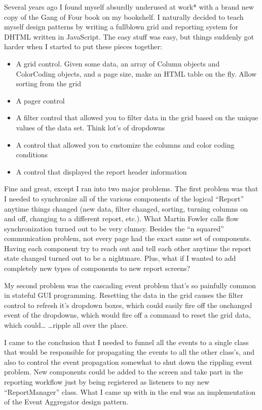 \documentclass{article}
\begin{document}
{Several years ago I found myself absurdly underused at work* with a brand new copy of the Gang of Four book on my bookshelf.  I naturally decided to teach myself design patterns by writing a fullblown grid and reporting system for DHTML written in JavaScript.  The easy stuff was easy, but things suddenly got harder when I started to put these pieces together:

 \begin{itemize}
     \item  A grid control.  Given some data, an array of Column objects and ColorCoding objects, and a page size, make an HTML table on the fly.  Allow sorting from the grid  
 \item  A pager control  
 \item  A filter control that allowed you to filter data in the grid based on the unique values of the data set.  Think lot's of dropdowns  
 \item  A control that allowed you to customize the columns and color coding conditions  
 \item  A control that displayed the report header information  
 \end{itemize}
 
Fine and great, except I  ran into two major problems.  The first problem was that I needed to synchronize all of the various components of the logical “Report” anytime things changed (new data, filter changed, sorting, turning columns on and off, changing to a different report, etc.).  What Martin Fowler calls flow synchronization turned out to be very clumsy.  Besides the “n squared” communication problem, not every page had the exact same set of components.  Having each component try to reach out and tell each other anytime the report state changed turned out to be a nightmare.  Plus, what if I wanted to add completely new types of components to new report screens?

My second problem was the cascading event problem that's so painfully common in stateful GUI programming.  Resetting the data in the grid causes the filter control to refresh it's dropdown boxes, which could easily fire off the onchanged event of the dropdowns, which would fire off a command to reset the grid data, which could…    …ripple all over the place. 

I came to the conclusion that I needed to funnel all the events to a single class that would be responsible for propagating the events to all the other class's, and also to control the event propagation somewhat to shut down the rippling event problem.  New components could be added to the screen and take part in the reporting workflow just by being registered as listeners to my new “ReportManager” class.   What I came up with in the end was an implementation of the Event Aggregator design pattern.

}
\end{document}
